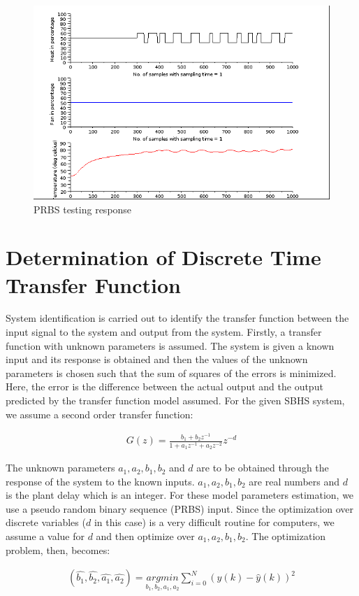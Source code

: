 \begin{figure}
\centering
\includegraphics[width=0.7\linewidth]{prbs/prbs-expt.png}
\caption{PRBS testing response}
\label{prbs-res}
\end{figure}


\section{Determination of Discrete Time Transfer Function}\label{prbs-model}

System identification is carried out to identify the transfer function between the input signal to the system and output 
from the system. Firstly, a transfer function with unknown parameters is assumed. The system is given a known input and its
response is obtained and then the values of the unknown parameters is chosen such that the sum of squares of the errors is 
minimized. Here, the error is the difference between the actual output and the output predicted by the transfer function model
assumed.
For the given SBHS system, we assume a second order transfer function:

\begin{align}\label{DTF}
G(z)=\frac{b_{1}+b_{2}z^{-1}}{1+a_{1}z^{-1}+a_{2}z^{-2}}z^{-d}
\end{align}


The unknown parameters $a_1, a_2, b_1, b_2$ and $d$ are to be obtained through the response of the system to the known inputs.
$a_1, a_2, b_1, b_2$ are real numbers and $d$ is the plant delay which is an integer.  For these model parameters estimation, we
use a pseudo random binary sequence (PRBS) input. Since the optimization over discrete variables ($d$ in this case) is a very 
difficult routine for computers, we assume a value for $d$ and then optimize over  $a_1, a_2, b_1, b_2$. The optimization 
problem, then, becomes:


\begin{align}
(\hat{b_1}, \hat{b_2}, \hat{a_1}, \hat{a_2})=\underset{b_1, b_2, a_1, a_2}{argmin}\sum_{i=0}^{N}(y(k)-\hat{y}(k))^{2}
\end{align}


